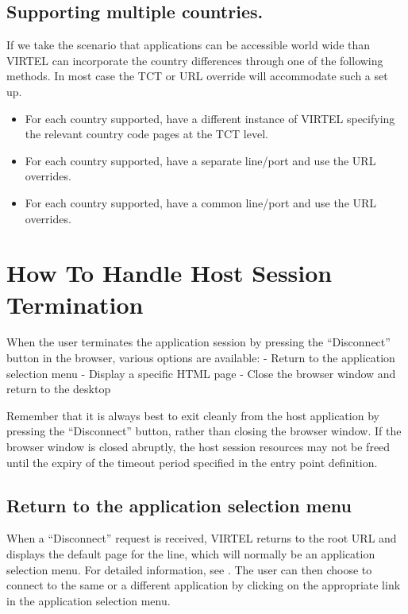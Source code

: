 \documentclass[letterpaper,10pt,english]{sphinxmanual}
\begin{document}
\subsection{Supporting multiple countries.}
\label{\detokenize{User_Guide:supporting-multiple-countries}}
If we take the scenario that applications can be accessible world wide than VIRTEL can incorporate the country differences through one of the following methods. In most case the TCT or URL override will accommodate such a set up.
\begin{itemize}
\item {} 
For each country supported, have a different instance of VIRTEL specifying the relevant country code pages at the TCT level.

\item {} 
For each country supported, have a separate line/port and use the URL overrides.

\item {} 
For each country supported, have a common line/port and use the URL overrides.

\end{itemize}


\section{How To Handle Host Session Termination}
\label{\detokenize{User_Guide:how-to-handle-host-session-termination}}
When the user terminates the application session by pressing the “Disconnect” button in the browser, various options are available:
- Return to the application selection menu
- Display a specific HTML page
- Close the browser window and return to the desktop

Remember that it is always best to exit cleanly from the host application by pressing the “Disconnect” button, rather than closing the browser window. If the browser window is closed abruptly, the host session resources may not be freed until the expiry of the timeout period specified in the entry point definition.


\subsection{Return to the application selection menu}
\label{\detokenize{User_Guide:return-to-the-application-selection-menu}}
When a “Disconnect” request is received, VIRTEL returns to the root URL and displays the default page for the line,
which will normally be an application selection menu. For detailed information, see {\hyperref[\detokenize{User_Guide:v457ug-url-formats}]{}}.
The user can then choose to connect to the same or a different application by clicking on the appropriate link in the
application selection menu.
\end{document}
